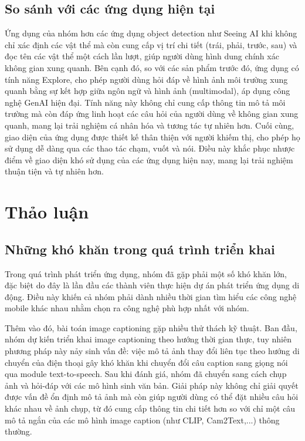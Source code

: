 \documentclass[a4paper,12pt]{article}
\begin{document}
\subsection{So sánh với các ứng dụng hiện tại}
Ứng dụng của nhóm hơn các ứng dụng object detection như Seeing AI khi không chỉ xác định các vật thể mà còn cung cấp vị trí chi tiết (trái, phải, trước, sau) và đọc tên các vật thể một cách lần lượt, giúp người dùng hình dung chính xác không gian xung quanh. Bên cạnh đó, so với các sản phẩm trước đó, ứng dụng có tính năng Explore, cho phép người dùng hỏi đáp về hình ảnh môi trường xung quanh bằng sự kết hợp giữa ngôn ngữ và hình ảnh (multimodal), áp dụng công nghệ GenAI hiện đại. Tính năng này không chỉ cung cấp thông tin mô tả môi trường mà còn đáp ứng linh hoạt các câu hỏi của người dùng về không gian xung quanh, mang lại trải nghiệm cá nhân hóa và tương tác tự nhiên hơn. Cuối cùng, giao diện của ứng dụng được thiết kế thân thiện với người khiếm thị, cho phép họ sử dụng dễ dàng qua các thao tác chạm, vuốt và nói. Điều này khắc phục nhược điểm về giao diện khó sử dụng của các ứng dụng hiện nay, mang lại trải nghiệm thuận tiện và tự nhiên hơn.

\section{Thảo luận}

\subsection{Những khó khăn trong quá trình triển khai}

Trong quá trình phát triển ứng dụng, nhóm đã gặp phải một số khó khăn lớn, đặc biệt do đây là lần đầu các thành viên thực hiện dự án phát triển ứng dụng di động. Điều này khiến cả nhóm phải dành nhiều thời gian tìm hiểu các công nghệ mobile khác nhau nhằm chọn ra công nghệ phù hợp nhất với nhóm.

Thêm vào đó, bài toán image captioning gặp nhiều thử thách kỹ thuật. Ban đầu, nhóm dự kiến triển khai image captioning theo hướng thời gian thực, tuy nhiên phương pháp này nảy sinh vấn đề: việc mô tả ảnh thay đổi liên tục theo hướng di chuyển của điện thoại gây khó khăn khi chuyển đổi câu caption sang giọng nói qua module text-to-speech. Sau khi đánh giá, nhóm đã chuyển sang cách chụp ảnh và hỏi-đáp với các mô hình sinh văn bản. Giải pháp này không chỉ giải quyết được vấn đề ổn định mô tả ảnh mà còn giúp người dùng có thể đặt nhiều câu hỏi khác nhau về ảnh chụp, từ đó cung cấp thông tin chi tiết hơn so với chỉ một câu mô tả ngắn của các mô hình image caption (như CLIP, Cam2Text,...) thông thường.
\end{document}
